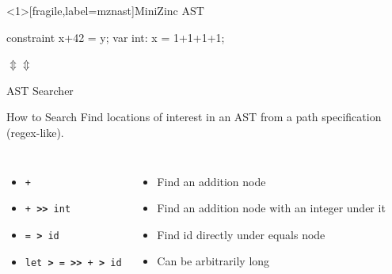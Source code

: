 \documentclass[aspectratio=169]{beamer} %
\begin{document}
\begin{frame}<1>[fragile,label=mznast]{MiniZinc AST}
  \begin{mznno}
   constraint x+42 = y;       var int: x = 1+1+1+1;
 \end{mznno}
 \hspace{2.75cm}$\Updownarrow$\hspace{6.3cm}$\Updownarrow$
 \bigskip
 \newif\ifshowastnumbers\showastnumbersfalse
 \newcommand\figastinsert{
   \uncover<2>{\node[ring] at (C-1-1) {};}
   \uncover<2>{\node[ring] at (C-1-1-2) {};}
   \uncover<3-4>{\node[ring] at (VX-1-1) {};}
   \uncover<3,6>{\node[ring] at (VX-1-1-2) {};}
   \uncover<4,5>{\node[ring] at (VX-1-1-1) {};}
   \uncover<5-8>{\node[ring] at (VX-1) {};}
   \uncover<7>{\node[ring] at (VX-1-2-1) {};}
   \uncover<8>{\node[ring] at (VX-1-2-2) {};}
   \uncover<9-10>{\node[ring] at (VX-1-2) {};}
   \uncover<9>{\node[ring] at (VX-1-2-2) {};}
   \uncover<10>{\node[ring] at (VX-1-2-1) {};}
 }
 
\end{frame}

\begin{frame}{AST Searcher}

  \begin{block}{How to Search}
    Find locations of interest in an AST from a path specification (regex-like).\pause
    \begin{columns}
      \begin{itemize}
        \item<2-> \texttt{+}
        \item<3-> \texttt{+ \textbf{>{}>} int}
        \item<4-> \texttt{= \textbf{>} id}
        \item<5-> \texttt{let \textbf{>} = \textbf{>{}>} + \textbf{>} id}
      \end{itemize}

      \begin{itemize}
        \item<2-> Find an addition node
        \item<3-> Find an addition node with an integer under it
        \item<4-> Find id directly under equals node
        \item<5-> Can be arbitrarily long
      \end{itemize}
    \end{columns}
  \end{block}
\end{frame}
\end{document}
